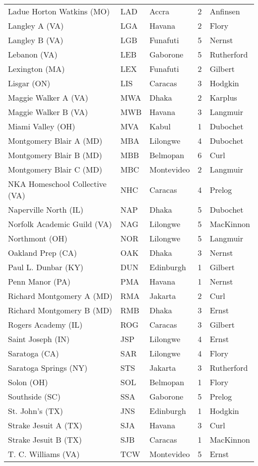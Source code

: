 \documentclass{article}%
\begin{document}
\begin{longtable}{|ll|lc|l|}
Ladue Horton Watkins (MO)&LAD&Accra&2&Anfinsen\\%
Langley A (VA)&LGA&Havana&2&Flory\\%
Langley B (VA)&LGB&Funafuti&5&Nernst\\%
Lebanon (VA)&LEB&Gaborone&5&Rutherford\\%
Lexington (MA)&LEX&Funafuti&2&Gilbert\\%
Lisgar (ON)&LIS&Caracas&3&Hodgkin\\%
Maggie Walker A (VA)&MWA&Dhaka&2&Karplus\\%
Maggie Walker B (VA)&MWB&Havana&3&Langmuir\\%
Miami Valley (OH)&MVA&Kabul&1&Dubochet\\%
Montgomery Blair A (MD)&MBA&Lilongwe&4&Dubochet\\%
Montgomery Blair B (MD)&MBB&Belmopan&6&Curl\\%
Montgomery Blair C (MD)&MBC&Montevideo&2&Langmuir\\%
NKA Homeschool Collective (VA)&NHC&Caracas&4&Prelog\\%
Naperville North (IL)&NAP&Dhaka&5&Dubochet\\%
Norfolk Academic Guild (VA)&NAG&Lilongwe&5&MacKinnon\\%
Northmont (OH)&NOR&Lilongwe&5&Langmuir\\%
Oakland Prep (CA)&OAK&Dhaka&3&Nernst\\%
Paul L. Dunbar (KY)&DUN&Edinburgh&1&Gilbert\\%
Penn Manor (PA)&PMA&Havana&1&Nernst\\%
Richard Montgomery A (MD)&RMA&Jakarta&2&Curl\\%
Richard Montgomery B (MD)&RMB&Dhaka&3&Ernst\\%
Rogers Academy (IL)&ROG&Caracas&3&Gilbert\\%
Saint Joseph (IN)&JSP&Lilongwe&4&Ernst\\%
Saratoga (CA)&SAR&Lilongwe&4&Flory\\%
Saratoga Springs (NY)&STS&Jakarta&3&Rutherford\\%
Solon (OH)&SOL&Belmopan&1&Flory\\%
Southside (SC)&SSA&Gaborone&5&Prelog\\%
St. John's (TX)&JNS&Edinburgh&1&Hodgkin\\%
Strake Jesuit A (TX)&SJA&Havana&3&Curl\\%
Strake Jesuit B (TX)&SJB&Caracas&1&MacKinnon\\%
T. C. Williams (VA)&TCW&Montevideo&5&Ernst\\%

\end{longtable}
\end{document}
